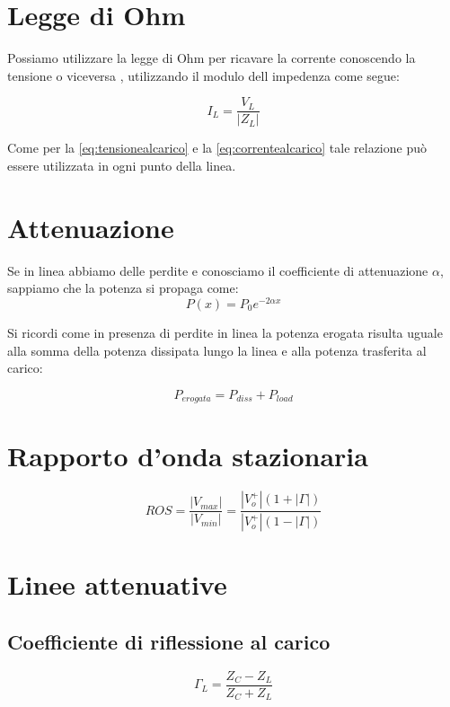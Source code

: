 \documentclass[10pt,a4paper]{report}
\begin{document}
	\section{Legge di Ohm}

	Possiamo utilizzare la legge di Ohm per ricavare la corrente conoscendo la tensione o viceversa , utilizzando il modulo dell impedenza come segue:

	\[
	I_L=\frac{V_L}{|Z_L|}
	\]

			Come per la \ref{eq:tensionealcarico} e la \ref{eq:correntealcarico} tale relazione può essere utilizzata in ogni punto della linea.


	\section{Attenuazione}

		Se in linea abbiamo delle perdite e conosciamo il coefficiente di attenuazione $\alpha$, sappiamo che la potenza si propaga come:
		\begin{equation}
		P(x)=P_0e^{-2 \alpha x}
		\end{equation}

		Si ricordi come in presenza di perdite in linea la potenza erogata risulta uguale alla somma della potenza dissipata lungo la linea e alla potenza trasferita al carico:

		\begin{equation}
		P_{erogata}=P_{diss}+P_{load}
		\end{equation}

	\section{Rapporto d'onda stazionaria}

	\begin{equation}
	ROS=\frac{|V_{max}|}{|V_{min}|}=\frac{|V_o^+|(1+|\Gamma|)}{|V_o^+|(1-|\Gamma|)}
	\end{equation}

	\section{Linee attenuative}

		\subsection{Coefficiente di riflessione al carico}

		\[
		\Gamma_L=\frac{Z_C-Z_L}{Z_C+Z_L}
		\]
\end{document}
